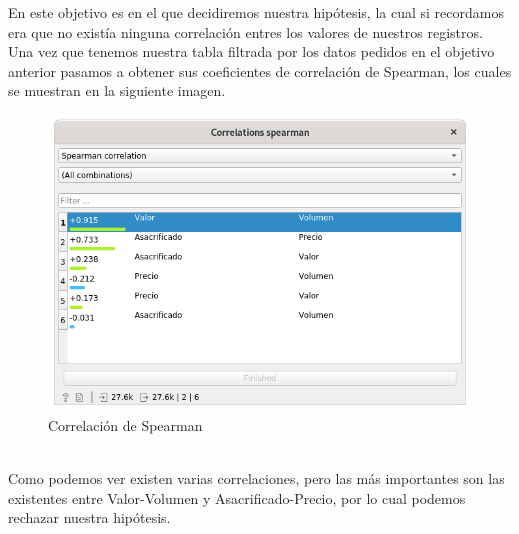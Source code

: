 \item En este objetivo es en el que decidiremos nuestra hipótesis, la cual si recordamos era que no existía ninguna correlación entres los valores de nuestros registros.\\
Una vez que tenemos nuestra tabla filtrada por los datos pedidos en el objetivo anterior pasamos a obtener sus coeficientes de correlación de Spearman, los cuales se muestran en la siguiente imagen. \\
            \begin{figure}[h]
                \centering
                \includegraphics[scale = 0.3]{imagenes/correlacion.png}
                \caption{Correlación de Spearman}
                \label{correlacion}
            \end{figure}
\\Como podemos ver existen varias correlaciones, pero las más importantes son las existentes entre Valor-Volumen y Asacrificado-Precio, por lo cual podemos rechazar nuestra hipótesis.